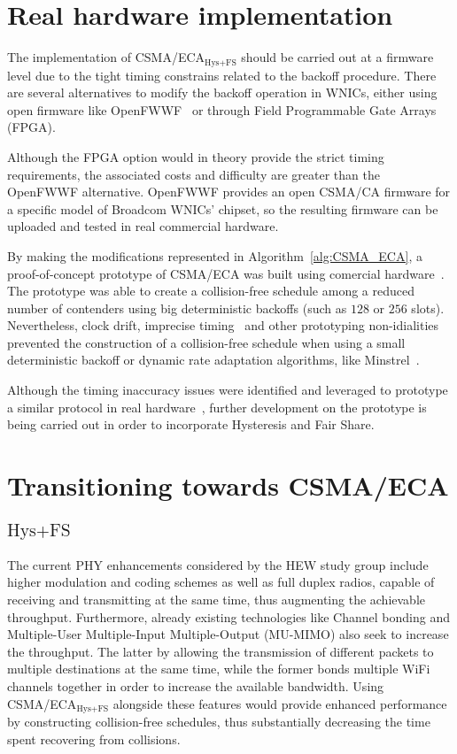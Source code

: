 \documentclass[a4paper,journal]{IEEEtran}
\begin{document}
\section{Real hardware implementation}\label{EDCA}
The implementation of CSMA/ECA$_{\text{Hys+FS}}$ should be carried out at a firmware level due to the tight timing constrains related to the backoff procedure. There are several alternatives to modify the backoff operation in WNICs, either using open firmware like OpenFWWF~\cite{OpenFWWF} or through Field Programmable Gate Arrays (FPGA).

Although the FPGA option would in theory provide the strict timing requirements, the associated costs and difficulty are greater than the OpenFWWF alternative. OpenFWWF provides an open CSMA/CA firmware for a specific model of Broadcom WNICs' chipset, so the resulting firmware can be uploaded and tested in real commercial hardware. 

By making the modifications represented in Algorithm~\ref{alg:CSMA_ECA}, a proof-of-concept prototype of CSMA/ECA was built using comercial hardware~\cite{ECA-DEMO-INFOCOM14, sanabria2013prototyping, BECA-test}. The prototype was able to create a collision-free schedule among a reduced number of contenders using big deterministic backoffs (such as $128$ or $256$ slots). Nevertheless, clock drift, imprecise timing~\cite{bianchi2007experimental} and other prototyping non-idialities prevented the construction of a collision-free schedule when using a small deterministic backoff or dynamic rate adaptation algorithms, like Minstrel~\cite{minstrel}.

Although the timing inaccuracy issues were identified and leveraged to prototype a similar protocol in real hardware~\cite{CF-MAC}, further development on the prototype is being carried out in order to incorporate Hysteresis and Fair Share.

\section{Transitioning towards CSMA/ECA$_{\text{Hys+FS}}$}\label{ECAtoCA}

The current PHY enhancements considered by the HEW study group include higher modulation and coding schemes as well as full duplex radios, capable of receiving and transmitting at the same time, thus augmenting the achievable throughput. Furthermore, already existing technologies like Channel bonding and Multiple-User Multiple-Input Multiple-Output (MU-MIMO) also seek to increase the throughput. The latter by allowing the transmission of different packets to multiple destinations at the same time, while the former bonds multiple WiFi channels together in order to increase the available bandwidth. Using CSMA/ECA$_{\text{Hys+FS}}$ alongside these features would provide enhanced performance by constructing collision-free schedules, thus substantially decreasing the time spent recovering from collisions.
\end{document}
